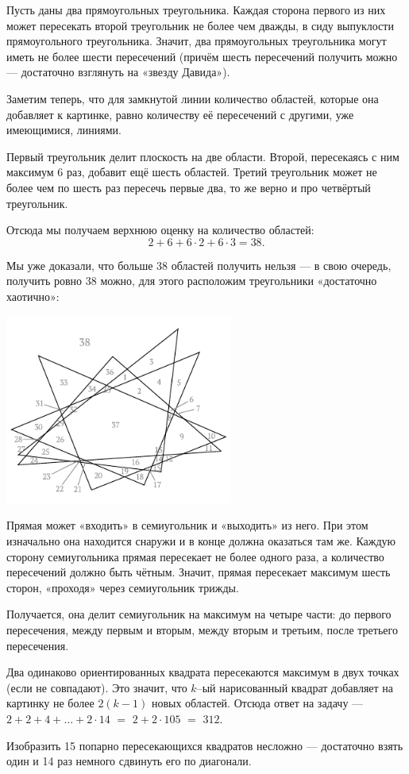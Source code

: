 \begin{itemize}

\itA Пусть даны два прямоугольных треугольника. Каждая сторона первого из них может пересекать второй треугольник не более чем дважды, в сиду выпуклости прямоугольного треугольника. Значит, два прямоугольных треугольника могут иметь не более шести пересечений (причём шесть пересечений получить можно — достаточно взглянуть на «звезду Давида»).

Заметим теперь, что для замкнутой линии количество областей, которые она добавляет к картинке, равно количеству её пересечений с другими, уже имеющимися, линиями.

Первый треугольник делит плоскость на две области. Второй, пересекаясь с ним максимум 6 раз, добавит ещё шесть областей. Третий треугольник может не более чем по шесть раз пересечь первые два, то же верно и про четвёртый треугольник.

Отсюда мы получаем верхнюю оценку на количество областей:
$$2 + 6 + 6 \cdot 2 + 6 \cdot 3 = 38.$$

Мы уже доказали, что больше 38 областей получить нельзя — в свою очередь, получить ровно 38 можно, для этого расположим треугольники «достаточно хаотично»:

\begin{center}
	\includegraphics[width=7.5cm]{figures/2017-5-1a}
\end{center}

\itB Прямая может «входить» в семиугольник и «выходить» из него. При этом изначально она находится снаружи и в конце должна оказаться там же. Каждую сторону семиугольника прямая пересекает не более одного раза, а количество пересечений должно быть чётным. Значит, прямая пересекает максимум шесть сторон, «проходя» через семиугольник трижды.

Получается, она делит семиугольник на максимум на четыре части: до первого пересечения, между первым и вторым, между вторым и третьим, после третьего пересечения.

\itC Два одинаково ориентированных квадрата пересекаются максимум в двух точках (если не совпадают). Это значит, что $k$--ый нарисованный квадрат добавляет на картинку не более $2(k-1)$ новых областей. Отсюда ответ на задачу — $2+2+4+\ldots+2\cdot 14$ $=$ $2+2\cdot105$ $=$ $312$.

Изобразить 15 попарно пересекающихся квадратов несложно — достаточно взять один и 14 раз немного сдвинуть его по диагонали.
\end{itemize}